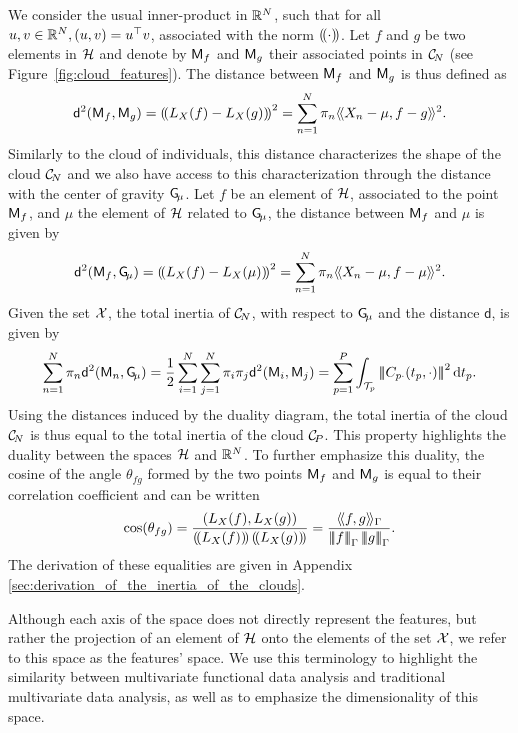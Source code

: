 We consider the usual inner-product in $\mathbb{R}^N$, such that for all $u, v \in \mathbb{R}^N, \left(u, v\right) = u^\top v$, associated with the norm $\left(\!\left(\cdot\right)\!\right)$. Let $f$ and $g$ be two elements in $\mathcal{H}$ and denote by $\mathsf{M}_f$ and $\mathsf{M}_g$ their associated points in $\mathcal{C}_{\!N}$ (see Figure~\ref{fig:cloud_features}). The distance between $\mathsf{M}_f$ and $\mathsf{M}_g$ is thus defined as
\begin{equation*}
\mathsf{d}^2(\mathsf{M}_f, \mathsf{M}_g) = \left(\!\left(L_X(f) - L_X(g)\right)\!\right)^2 = \sum_{n = 1}^N \pi_n \langle\!\langle X_n - \mu, f - g\rangle\!\rangle^2.
\end{equation*}
Similarly to the cloud of individuals, this distance characterizes the shape of the cloud $\mathcal{C}_{\!N}$ and we also have access to this characterization through the distance with the center of gravity $\mathsf{G}_{\!\mu}$. Let $f$ be an element of $\mathcal{H}$, associated to the point $\mathsf{M}_f$, and $\mu$ the element of $\mathcal{H}$ related to $\mathsf{G}_{\!\mu}$, the distance between $\mathsf{M}_f$ and $\mu$ is given by
\begin{equation*}
\mathsf{d}^2(\mathsf{M}_f, \mathsf{G}_{\!\mu}) = \left(\!\left(L_X(f) - L_X(\mu)\right)\!\right)^2 = \sum_{n = 1}^N \pi_n \langle\!\langle X_n - \mu, f - \mu\rangle\!\rangle^2.
\end{equation*}
Given the set $\mathcal{X}$, the total inertia of $\mathcal{C}_{\!N}$, with respect to $\mathsf{G}_{\!\mu}$ and the distance $\mathsf{d}$, is given by
\begin{equation}\label{eq:inertia_CN}
    \sum_{n = 1}^N \pi_n \mathsf{d}^2(\mathsf{M}_n, \mathsf{G}_{\!\mu}) = \frac{1}{2}\sum_{i = 1}^N \sum_{j = 1}^N \pi_i \pi_j \mathsf{d}^2(\mathsf{M}_i, \mathsf{M}_j) = \sum_{p = 1}^P \int_{\mathcal{T}_{p}} \left|\!\left|\!\left|C_{p \cdot}(t_p, \cdot)\right|\!\right|\!\right|^2 {\rm d} t_p.
\end{equation}
Using the distances induced by the duality diagram, the total inertia of the cloud $\mathcal{C}_{\!N}$ is thus equal to the total inertia of the cloud $\mathcal{C}_{\!P}$. This property highlights the duality between the spaces $\mathcal{H}$ and $\mathbb{R}^N$. To further emphasize this duality, the cosine of the angle $\theta_{fg}$ formed by the two points $\mathsf{M}_f$ and $\mathsf{M}_g$ is equal to their correlation coefficient and can be written
\begin{equation}
    \cos(\theta_{fg}) = \frac{\inR{L_X(f)}{L_X(g)}}{\normR{L_X(f)}\normR{L_X(g)}}
    = \frac{\inHG{f}{g}}{\normHG{f}\normHG{g}}.
\end{equation}
The derivation of these equalities are given in Appendix \ref{sec:derivation_of_the_inertia_of_the_clouds}.

\begin{remark}
   Although each axis of the space does not directly represent the features, but rather the projection of an element of $\mathcal{H}$ onto the elements of the set $\mathcal{X}$, we refer to this space as the features' space. We use this terminology to highlight the similarity between multivariate functional data analysis and traditional multivariate data analysis, as well as to emphasize the dimensionality of this space.
\end{remark}

